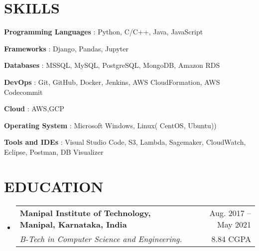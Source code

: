 \documentclass[letterpaper,11pt]{article}
\makeatletter
\newcommand{\resumeSubheading}[4]{
  \vspace{-1pt}\item
    \begin{tabular*}{\textwidth}[t]{l@{\extracolsep{\fill}}r}
      \textbf{#1} & {\color{dark-grey}\small #2}\vspace{1pt}\\ %
      \textit{#3} & {\color{dark-grey} \small #4}\\ %
    \end{tabular*}\vspace{-4pt}
}
\newcommand{\resumeSubHeadingListStart}{\begin{itemize}[leftmargin=0in, label={}]}
\newcommand{\resumeSubHeadingListEnd}{\end{itemize}}
\makeatother
\begin{document}
\section{SKILLS}
 \begin{itemize}[leftmargin=0.3in]
   \setlength{\itemsep}{1pt}
   \setlength{\parskip}{0pt}
   \setlength{\parsep}{0pt}
    \small{\item{
    \textbf{Programming Languages} {: Python, C/C++, Java, JavaScript}\vspace{2pt} \\}
    \item{\textbf{Frameworks} {: Django, Pandas, Jupyter}\vspace{2pt} \\}
    \item{\textbf{Databases} {: MSSQL, MySQL, PostgreSQL, MongoDB, Amazon RDS}\vspace{2pt} \\}
    \item{\textbf{DevOps} {: Git, GitHub, Docker, Jenkins, AWS CloudFormation, AWS Codecommit}\vspace{2pt} \\}
    \item{\textbf{Cloud}     {: AWS,GCP}\vspace{2pt} \\}
    \item{\textbf{Operating System} {: Microsoft Windows, Linux( CentOS, Ubuntu))}\vspace{2pt} \\}
    \item{\textbf{Tools and IDEs} {: Visual Studio Code, S3, Lambda, Sagemaker, CloudWatch, Eclipse, Postman, DB Visualizer}\vspace{2pt} \\}
    }
 \end{itemize}
 


\section {EDUCATION}
  \resumeSubHeadingListStart
    \resumeSubheading
      {Manipal Institute of Technology, Manipal, Karnataka, India}{Aug. 2017 -- May 2021}
      {B-Tech in Computer Science and Engineering. }{8.84 CGPA}
  \resumeSubHeadingListEnd

\end{document}
